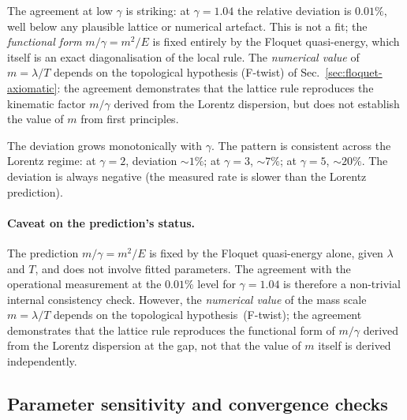 \documentclass[11pt,a4paper]{article}
\begin{document}
The agreement at low $\gamma$ is striking: at $\gamma = 1.04$
the relative deviation is $0.01\%$, well below any plausible
lattice or numerical artefact. This is not a fit; the
\emph{functional form} $m/\gamma = m^2/E$ is fixed entirely by
the Floquet quasi-energy, which itself is an exact
diagonalisation of the local rule. The \emph{numerical value}
of $m = \lambda/T$ depends on the topological hypothesis
(F-twist) of Sec.~\ref{sec:floquet-axiomatic}: the agreement
demonstrates that the lattice rule reproduces the kinematic
factor $m/\gamma$ derived from the Lorentz dispersion, but does
not establish the value of $m$ from first principles.

The deviation grows monotonically with $\gamma$. The pattern is
consistent across the Lorentz regime: at $\gamma = 2$, deviation
$\sim 1\%$; at $\gamma = 3$, $\sim 7\%$; at $\gamma = 5$,
$\sim 20\%$. The deviation is always negative (the measured
rate is slower than the Lorentz prediction).

\paragraph{Caveat on the prediction's status.}
The prediction $m/\gamma = m^2/E$ is fixed by the Floquet
quasi-energy alone, given $\lambda$ and $T$, and does not
involve fitted parameters. The agreement with the operational
measurement at the $0.01\%$ level for $\gamma = 1.04$ is
therefore a non-trivial internal consistency check. However, the
\emph{numerical value} of the mass scale $m = \lambda/T$ depends
on the topological hypothesis~(F-twist); the agreement
demonstrates that the lattice rule reproduces the functional
form of $m/\gamma$ derived from the Lorentz dispersion at the
gap, not that the value of $m$ itself is derived independently.

\subsection{Parameter sensitivity and convergence checks}
\label{sec:convergence}
\end{document}
